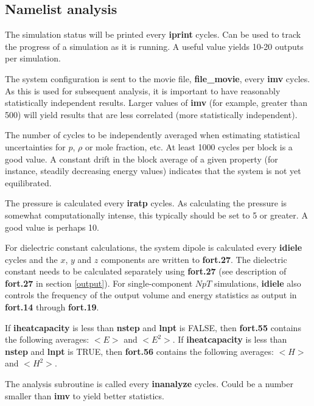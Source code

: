 \documentclass[12pt,letterpaper]{article}
\begin{document}
\subsection{Namelist \textbf{analysis}}
 The simulation status will be printed
every {\bf iprint} cycles. Can be used to track the progress
of a simulation as it is running. A useful value yields
10-20 outputs per simulation.

 The system configuration is sent to the
movie file, {\bf file\_movie}, every {\bf imv} cycles. As
this is used for subsequent analysis, it is important to
have reasonably statistically independent results. Larger
values of {\bf imv} (for example, greater than 500) will
yield results that are less correlated (more statistically
independent).

 The number of cycles to be
independently averaged when estimating statistical
uncertainties for $p$, $\rho$ or mole fraction, etc. At
least 1000 cycles per block is a good value. A constant
drift in the block average of a given property (for
instance, steadily decreasing energy values) indicates that
the system is not yet equilibrated.

 The pressure is calculated every {\bf
  iratp} cycles. As calculating the pressure is somewhat
computationally intense, this typically should be set to 5
or greater. A good value is perhaps 10.

 For dielectric constant calculations,
the system dipole is calculated every {\bf idiele} cycles
and the $x$, $y$ and $z$ components are written to {\bf
  fort.27}. The dielectric constant needs to be calculated
separately using {\bf fort.27} (see description of {\bf
  fort.27} in section \ref{output}). For single-component
$NpT$ simulations, {\bf idiele} also controls the frequency
of the output volume and energy statistics as output in {\bf
  fort.14} through {\bf fort.19}.

 If {\bf iheatcapacity} is less
than {\bf nstep} and {\bf lnpt} is FALSE, then {\bf fort.55}
contains the following averages: $<E>$ and $<E^2>$. If {\bf
  iheatcapacity} is less than {\bf nstep} and {\bf lnpt} is
TRUE, then {\bf fort.56} contains the following averages:
$<H>$ and $<H^2>$.

 The analysis subroutine is called
every {\bf inanalyze} cycles. Could be a number smaller than
{\bf imv} to yield better statistics.
\end{document}
